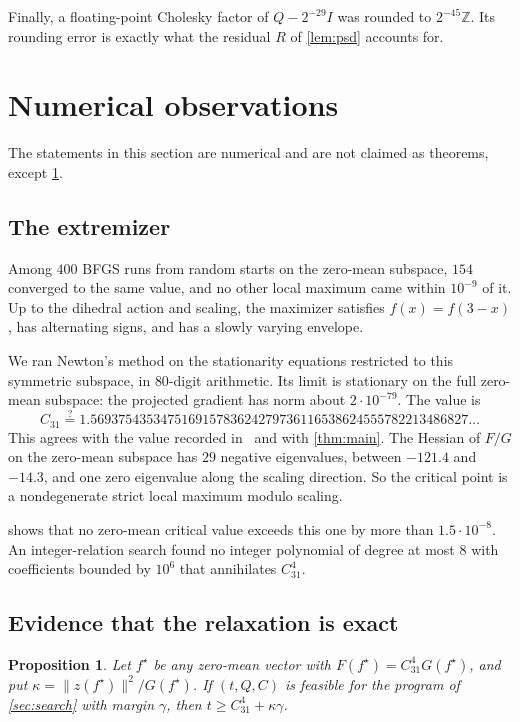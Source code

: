 \documentclass[11pt]{amsart}
\newtheorem{proposition}[theorem]{Proposition}
\theoremstyle{definition}
\theoremstyle{remark}
\newcommand{\Z}{\mathbb{Z}}
\begin{document}
Finally, a floating-point Cholesky factor of $Q-2^{-29}I$ was rounded to $2^{-45}\Z$. Its rounding error is exactly what the residual $R$ of \cref{lem:psd} accounts for.

\section{Numerical observations}\label{sec:numerics}

The statements in this section are numerical and are not claimed as theorems, except \cref{prop:kappa}.

\subsection{The extremizer}
Among $400$ BFGS runs from random starts on the zero-mean subspace, $154$ converged to the same value, and no other local maximum came within $10^{-9}$ of it. Up to the dihedral action and scaling, the maximizer satisfies $f(x)=f(3-x)$, has alternating signs, and has a slowly varying envelope.

We ran Newton's method on the stationarity equations restricted to this symmetric subspace, in $80$-digit arithmetic. Its limit is stationary on the full zero-mean subspace: the projected gradient has norm about $2\cdot10^{-79}$. The value is
\[
  C_{31}\stackrel{?}{=}1.569375435347516915783624279736116538624555782213486827\ldots
\]
This agrees with the value recorded in~\cite{tdbR144} and with \cref{thm:main}. The Hessian of $F/G$ on the zero-mean subspace has $29$ negative eigenvalues, between $-121.4$ and $-14.3$, and one zero eigenvalue along the scaling direction. So the critical point is a nondegenerate strict local maximum modulo scaling.

 shows that no zero-mean critical value exceeds this one by more than $1.5\cdot10^{-8}$. An integer-relation search found no integer polynomial of degree at most $8$ with coefficients bounded by $10^6$ that annihilates $C_{31}^4$.

\subsection{Evidence that the relaxation is exact}

\begin{proposition}\label{prop:kappa}
Let $f^\star$ be any zero-mean vector with $F(f^\star)=C_{31}^4G(f^\star)$, and put $\kappa=\|z(f^\star)\|^2/G(f^\star)$. If $(t,Q,C)$ is feasible for the program of \cref{sec:search} with margin $\gamma$, then $t\ge C_{31}^4+\kappa\gamma$.
\end{proposition}
\end{document}
